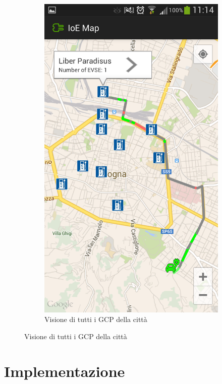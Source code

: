 \begin{figure}
\begin{subfigure}{0.45\textwidth}
		\includegraphics[width=\textwidth]{assets/mobile-app-map-gcp.png}
		\caption{Visione di tutti i GCP della città}
		\label{fig:map-gcp}
    \end{subfigure}
\end{figure}

\section{Implementazione}


